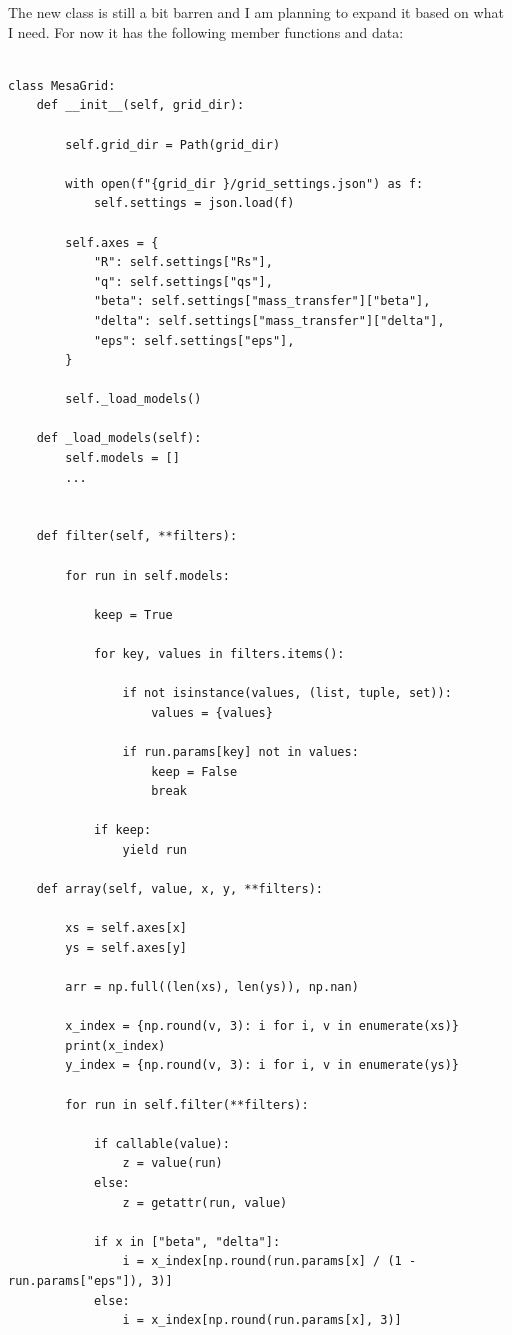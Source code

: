 \documentclass[a4paper,10pt]{article}
\begin{document}
The new class is still a bit barren and I am planning to expand it based on what I need. For now it has the following member functions and data:
\begin{verbatim}

class MesaGrid:
    def __init__(self, grid_dir):

        self.grid_dir = Path(grid_dir)

        with open(f"{grid_dir }/grid_settings.json") as f:
            self.settings = json.load(f)

        self.axes = {
            "R": self.settings["Rs"],
            "q": self.settings["qs"],
            "beta": self.settings["mass_transfer"]["beta"],
            "delta": self.settings["mass_transfer"]["delta"],
            "eps": self.settings["eps"],
        }

        self._load_models()

    def _load_models(self):
        self.models = []
        ...


    def filter(self, **filters):

        for run in self.models:

            keep = True

            for key, values in filters.items():

                if not isinstance(values, (list, tuple, set)):
                    values = {values}

                if run.params[key] not in values:
                    keep = False
                    break

            if keep:
                yield run

    def array(self, value, x, y, **filters):

        xs = self.axes[x]
        ys = self.axes[y]

        arr = np.full((len(xs), len(ys)), np.nan)

        x_index = {np.round(v, 3): i for i, v in enumerate(xs)}
        print(x_index)
        y_index = {np.round(v, 3): i for i, v in enumerate(ys)}

        for run in self.filter(**filters):

            if callable(value):
                z = value(run)
            else:
                z = getattr(run, value)

            if x in ["beta", "delta"]:
                i = x_index[np.round(run.params[x] / (1 - run.params["eps"]), 3)]
            else:
                i = x_index[np.round(run.params[x], 3)]


\end{verbatim}
\end{document}
